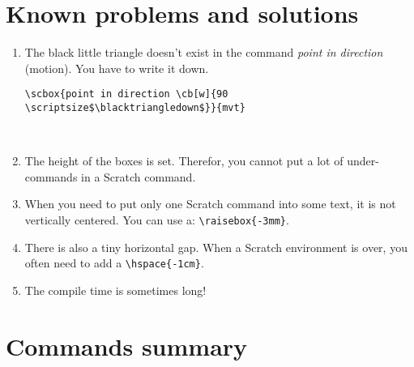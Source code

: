 \documentclass[a4paper,11pt]{article}
\begin{document}
\newpage
\section{Known problems and solutions}
\begin{enumerate}
\item
The black little triangle doesn't exist in the command \emph{point in direction} (motion). You have to write it down.
\begin{verbatim}
\scbox{point in direction \cb[w]{90 \scriptsize$\blacktriangledown$}}{mvt}
\end{verbatim}
\\

\item The height of the boxes is set. Therefor, you cannot put a lot of under-commands in a Scratch command.\\

\item When you need to put only one Scratch command into some text, it is not vertically centered. You can use a: \texttt{\textbackslash raisebox\{-3mm\}}.\\

\item There is also a tiny horizontal gap. When a Scratch environment is over, you often need to add a \texttt{\textbackslash hspace\{-1cm\}}.\\

\item The compile time is sometimes long!
\end{enumerate}

\section{Commands summary}
\end{document}
